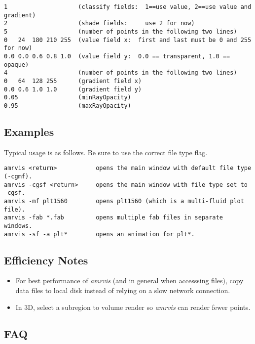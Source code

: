 \begin{verbatim}
1                    (classify fields:  1==use value, 2==use value and gradient)
2                    (shade fields:     use 2 for now)
5                    (number of points in the following two lines)
0   24  180 210 255  (value field x:  first and last must be 0 and 255 for now)
0.0 0.0 0.6 0.8 1.0  (value field y:  0.0 == transparent, 1.0 == opaque)
4                    (number of points in the following two lines)
0   64  128 255      (gradient field x)
0.0 0.6 1.0 1.0      (gradient field y)
0.05                 (minRayOpacity)
0.95                 (maxRayOpacity)
\end{verbatim}



\subsection{Examples}

Typical usage is as follows.  Be sure to use the correct file type flag.

\begin{verbatim}
amrvis <return>           opens the main window with default file type (-cgmf).
amrvis -cgsf <return>     opens the main window with file type set to -cgsf.
amrvis -mf plt1560        opens plt1560 (which is a multi-fluid plot file).
amrvis -fab *.fab         opens multiple fab files in separate windows.
amrvis -sf -a plt*        opens an animation for plt*.
\end{verbatim}


\subsection{Efficiency Notes}

\begin{itemize}
\item For best performance of {\em amrvis} (and in general when
accesssing files), copy data files to local disk instead
of relying on a slow network connection.

\item In 3D, select a subregion to volume render so
{\em amrvis} can render fewer points.

\end{itemize}


\subsection{FAQ}

